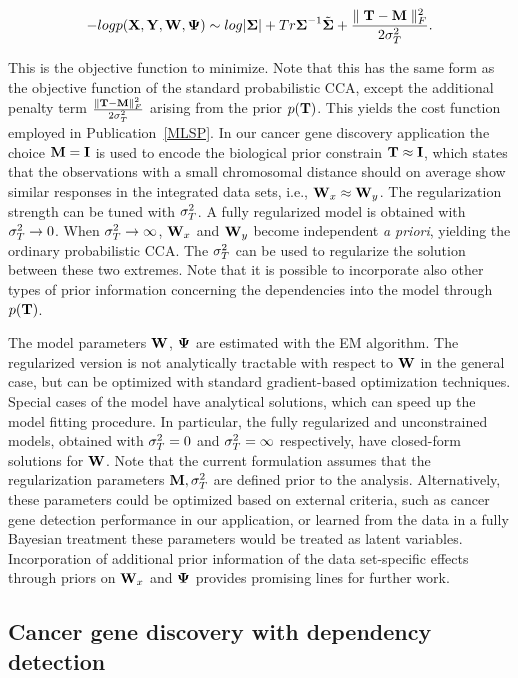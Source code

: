 \begin{equation}\label{eq:simccacost}
  -logp(\mathbf{X}, \mathbf{Y}, \mathbf{W}, \mathbf{\Psi}) \sim log|\boldsymbol{\Sigma}| + Tr \boldsymbol{\Sigma}^{-1} \tilde{\boldsymbol{\Sigma}} +
  \frac{\parallel \mathbf{T} - \mathbf{M} \parallel_{F}^2}{2\sigma_T^2}.
\end{equation}

\noindent This is the objective function to minimize. Note that this
has the same form as the objective function of the standard
probabilistic CCA, except the additional penalty term
\(\frac{\parallel \mathbf{T} - \mathbf{M} \parallel_{F}^2}{2\sigma_T^2}\) arising from the
prior \(p(\mathbf{T})\). This yields the cost function employed in
Publication~\ref{MLSP}. In our cancer gene discovery application the
choice \(\mathbf{M} = \mathbf{I}\) is used to encode the biological prior constrain
\(\mathbf{T} \approx \mathbf{I}\), which states that the observations with a small
chromosomal distance should on average show similar responses in the
integrated data sets, i.e., \(\mathbf{W}_x \approx \mathbf{W}_y\). The regularization
strength can be tuned with \(\sigma_T^2\). A fully regularized model is
obtained with \(\sigma_T^2 \rightarrow 0\). When \(\sigma_T^2 \rightarrow
\infty\), $\mathbf{W}_x$ and $\mathbf{W}_y$ become independent {\it a priori},
yielding the ordinary probabilistic CCA. The \(\sigma_T^2\) can be used to
regularize the solution between these two extremes. Note that it is
possible to incorporate also other types of prior information
concerning the dependencies into the model through \(p(\mathbf{T})\).

The model parameters \(\mathbf{W}\), \(\mathbf{\Psi}\) are estimated with the EM
algorithm. The regularized version is not analytically tractable with
respect to \(\mathbf{W}\) in the general case, but can be optimized with
standard gradient-based optimization techniques. Special cases of the
model have analytical solutions, which can speed up the model fitting
procedure. In particular, the fully regularized and unconstrained
models, obtained with \(\sigma_T^2 = 0\) and \(\sigma_T^2 = \infty\)
respectively, have closed-form solutions for \(\mathbf{W}\). Note that the
current formulation assumes that the regularization parameters \(\mathbf{M},
\sigma_T^2\) are defined prior to the analysis. Alternatively, these
parameters could be optimized based on external criteria, such as
cancer gene detection performance in our application, or learned from
the data in a fully Bayesian treatment these parameters would be
treated as latent variables. Incorporation of additional prior
information of the data set-specific effects through priors on
\(\mathbf{W}_x\) and \(\mathbf{\Psi}\) provides promising lines for further work.

\subsection{Cancer gene discovery with dependency detection}


